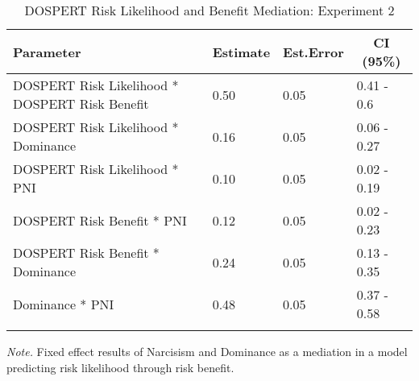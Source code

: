 \documentclass[
  donotrepeattitle,doc, 12pt, a4paper,floatsintext]{apa7}
\begin{document}
\begin{table}[ht]

\begin{center}
\begin{threeparttable}

\caption{\label{tab:MediationBRMS3Exp2}DOSPERT Risk Likelihood and Benefit Mediation: Experiment 2}

\small{

\begin{tabular}{llll}
\toprule
Parameter & \multicolumn{1}{c}{Estimate} & \multicolumn{1}{c}{Est.Error} & \multicolumn{1}{c}{CI (95\%)}\\
\midrule
DOSPERT Risk Likelihood * DOSPERT Risk Benefit & 0.50 & 0.05 & 0.41 - 0.6\\
DOSPERT Risk Likelihood * Dominance & 0.16 & 0.05 & 0.06 - 0.27\\
DOSPERT Risk Likelihood * PNI & 0.10 & 0.05 & 0.02 - 0.19\\
DOSPERT Risk Benefit * PNI & 0.12 & 0.05 & 0.02 - 0.23\\
DOSPERT Risk Benefit * Dominance & 0.24 & 0.05 & 0.13 - 0.35\\
Dominance * PNI & 0.48 & 0.05 & 0.37 - 0.58\\
\bottomrule
\addlinespace
\end{tabular}

}

\begin{tablenotes}[para]
\normalsize{\textit{Note.} Fixed effect results of Narcisism and Dominance as a mediation in a model predicting risk likelihood through risk benefit.}
\end{tablenotes}

\end{threeparttable}
\end{center}

\end{table}
\clearpage\pagestyle{empty}
\end{document}
